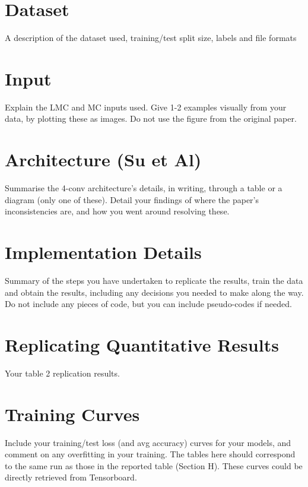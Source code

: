 \documentclass[conference]{IEEEtran}
\begin{document}
\section{Dataset}
A description of the dataset used, training/test split size, labels and file formats

\section{Input}
Explain the LMC and MC inputs used. Give 1-2 examples visually from your data, by plotting these as images. Do not use the figure from the original paper. 

\section{Architecture (Su et Al)}
Summarise the 4-conv architecture’s details, in writing, through a table or a diagram (only one of these). Detail your findings of where the paper’s inconsistencies are, and how you went around resolving these. 

\section{Implementation Details}
Summary of the steps you have undertaken to replicate the results, train the data and obtain the results, including any decisions you needed to make along the way. Do not include any pieces of code, but you can include pseudo-codes if needed. 

\section{Replicating Quantitative Results}
Your table 2 replication results. 

\section{Training Curves}
Include your training/test loss (and avg accuracy) curves for your models, and comment on any overfitting in your training. The tables here should correspond to the same run as those in the reported table (Section H). These curves could be directly retrieved from Tensorboard. 
\end{document}
